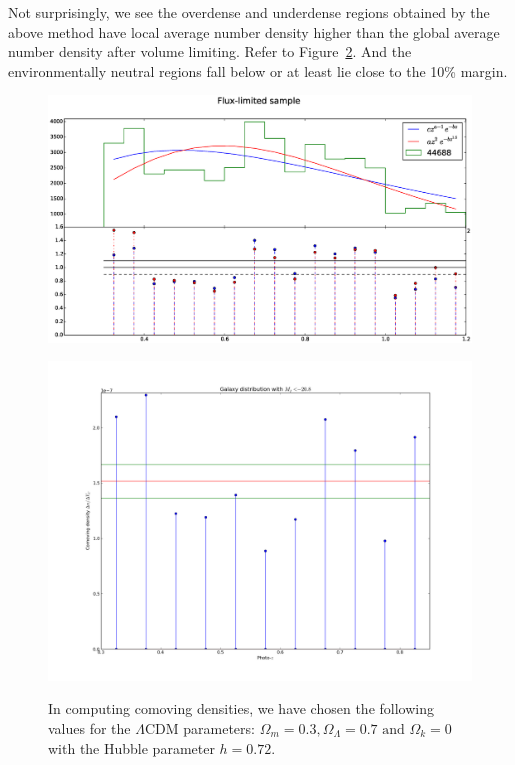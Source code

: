 \documentclass[twocolumn,useAMS,usenatbib]{mn2e}
\begin{document}
Not surprisingly, we see the overdense and underdense regions obtained by the above method have local average number density higher than the global average number density after volume limiting. Refer to Figure~\ref{fig:comoving_densities}.
And the environmentally neutral regions fall below or at least lie close to the 10\% margin.

\begin{figure}
 \centering
  \includegraphics[width=\columnwidth]{redshift_fluxlimited}
  \label{fig:redshift_fluxlimited}
  \caption{}
\end{figure}

\begin{figure}
 \centering
 \includegraphics[width=\columnwidth]{../plots_20140219/comoving_densities(2b).png}
 \label{fig:comoving_densities}
 \caption{In computing comoving densities, we have chosen the following values for the $\Lambda$CDM parameters: $\Omega_m = 0.3, \Omega_\Lambda = 0.7 \text{ and } \Omega_k = 0$ with the Hubble parameter $h = 0.72$.}
\end{figure}
\end{document}
